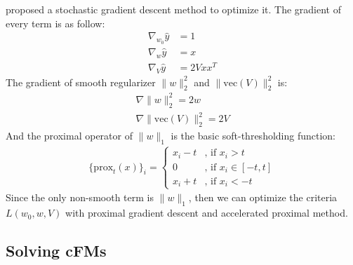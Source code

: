 \documentclass{article}
\newcommand{\diag}{\text{diag}}
\newcommand{\prox}{\text{prox}}
\newcommand{\vecc}{\text{vec}}
\begin{document}
\cite{FM_paper} proposed a stochastic gradient descent method to optimize it. The gradient of every term is as follow:
\begin{align*}
  \nabla_{w_0} \hat{y} &= 1 \\
  \nabla_w \hat{y} &= x \\
  \nabla_{V} \hat{y} &= 2 V x x^T
\end{align*}
The gradient of smooth regularizer $\|w\|_2^2$ and $\|\vecc(V)\|_2^2$ is:
\begin{align*}
  \nabla \|w\|_2^2 = 2w \\
  \nabla \|\vecc(V)\|_2^2 = 2V
\end{align*}
And the proximal operator of $\|w\|_1$ is the basic soft-thresholding function:
\begin{align*}
\{\prox_t(x)\}_i = 
\begin{cases}
  x_i - t & \text{, if $x_i > t$} \\
  0 & \text{, if $x_i \in [-t, t]$} \\
  x_i + t & \text{, if $x_i < -t$}
  \end{cases}
\end{align*}
Since the only non-smooth term is $\|w\|_1$, then we can optimize the criteria $L(w_0, w, V)$ with proximal gradient descent and accelerated proximal method. 


\subsection{Solving cFMs}
\end{document}
